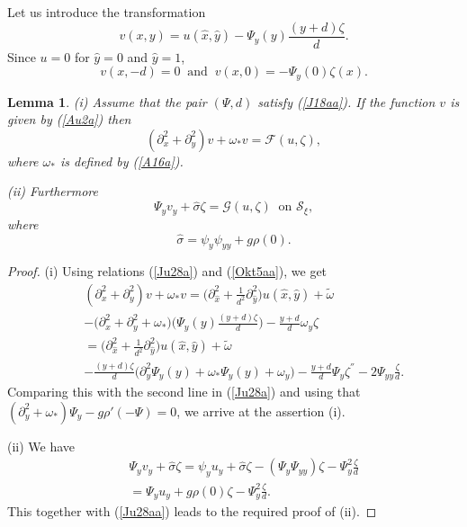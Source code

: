 \documentclass[a4paper,reqno,12pt]{amsart}
\theoremstyle{plain}
\newtheorem{lemma}[theorem]{Lemma}
\theoremstyle{definition}
\numberwithin{equation}{section}
\begin{document}
Let us introduce the transformation
\begin{equation}\label{Au2a}
v(x,y)=u(\hat{x},\hat{y})-\Psi_{y}(y)\frac{(y+d)\zeta}{d}.
\end{equation}
Since $u=0$ for $\hat{y}=0$ and $\hat{y}=1$,
\begin{equation}\label{A14a}
v(x,-d)=0\;\;\mbox{and}\;\;v(x,0)=-\Psi_y(0)\zeta(x).
\end{equation}

\begin{lemma}\label{LA17a} (i) Assume that the pair $(\Psi,d)$  satisfy (\ref{J18aa}). If the function  $v$ is given by (\ref{Au2a}) then
\begin{equation}\label{A14aa}
(\partial_x^2+\partial_y^2)v+\omega_*v={\mathcal F}(u,\zeta),
\end{equation}
where $\omega_*$ is defined by (\ref{A16a}).


(ii) Furthermore
\begin{equation}\label{A14ab}
\Psi_yv_y+\hat{\sigma}\zeta={\mathcal G}(u,\zeta)\;\;
\mbox{on ${\mathcal S}_\xi$},
\end{equation}
where
$$
\hat{\sigma}=\psi_y\psi_{yy}+g\rho(0).
$$

\end{lemma}
\begin{proof} (i) Using relations (\ref{Ju28a}) and (\ref{Okt5aa}), we get
\begin{eqnarray*}
&&(\partial_x^2+\partial_y^2)v+\omega_*v=\Big(\partial_{\hat{x}}^2
+\frac{1}{d^2}\partial_{\hat{y}}^2 \Big)u(\hat{x},\hat{y})+\tilde{\omega}\\
&&-\Big(\partial_x^2+\partial_y^2+\omega_*\Big)\Big(\Psi_{y}(y)
\frac{(y+d)\zeta}{d}\Big)-\frac{y+d}{d}\omega_y\zeta\\
&&=\Big(\partial_{\hat{x}}^2
+\frac{1}{d^2}\partial_{\hat{y}}^2 \Big)u(\hat{x},\hat{y})+\tilde{\omega}
\\
&&-\frac{(y+d)\zeta}{d}\Big(\partial_y^2\Psi_{y}(y)
+\omega_*\Psi_{y}(y)+\omega_y\Big)
-\frac{y+d}{d}\Psi_y\zeta^{''}-2\Psi_{yy}\frac{\zeta}{d}.
\end{eqnarray*}
 Comparing this with the second line in (\ref{Ju28a}) and using that $(\partial_y^2
+\omega_*)\Psi_{y}-g\rho'(-\Psi)=0$, we arrive at the assertion (i).

(ii) We have
\begin{eqnarray*}
&&\Psi_yv_y+\hat{\sigma}\zeta=\psi_yu_y+\hat{\sigma}\zeta
-(\Psi_y\Psi_{yy})\zeta-\Psi_y^2\frac{\zeta}{d}\\
&&=\Psi_yu_y+g\rho(0)\zeta-\Psi_y^2\frac{\zeta}{d}.
\end{eqnarray*}
This together with (\ref{Ju28aa}) leads to the required proof of (ii).
\end{proof}
\end{document}

